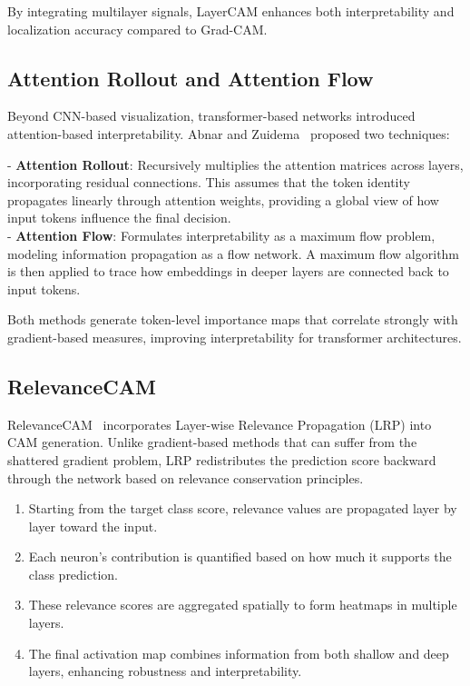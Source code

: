 By integrating multilayer signals, LayerCAM\cite{layer_cam} enhances both interpretability and localization accuracy compared to Grad-CAM.

\subsection{Attention Rollout and Attention Flow}
Beyond CNN-based visualization, transformer-based networks introduced attention-based interpretability. Abnar and Zuidema~\cite{attention_rollout} proposed two techniques:

- \textbf{Attention Rollout}: Recursively multiplies the attention matrices across layers, incorporating residual connections. This assumes that the token identity propagates linearly through attention weights, providing a global view of how input tokens influence the final decision. \\
- \textbf{Attention Flow}: Formulates interpretability as a maximum flow problem, modeling information propagation as a flow network. A maximum flow algorithm is then applied to trace how embeddings in deeper layers are connected back to input tokens.

Both methods generate token-level importance maps that correlate strongly with gradient-based measures, improving interpretability for transformer architectures.

\subsection{RelevanceCAM}
RelevanceCAM~\cite{relevance_cam} incorporates Layer-wise Relevance Propagation (LRP) into CAM generation. Unlike gradient-based methods that can suffer from the shattered gradient problem, LRP redistributes the prediction score backward through the network based on relevance conservation principles.

\begin{enumerate}
    \item Starting from the target class score, relevance values are propagated layer by layer toward the input.
    \item Each neuron's contribution is quantified based on how much it supports the class prediction.
    \item These relevance scores are aggregated spatially to form heatmaps in multiple layers.
    \item The final activation map combines information from both shallow and deep layers, enhancing robustness and interpretability.
\end{enumerate}

